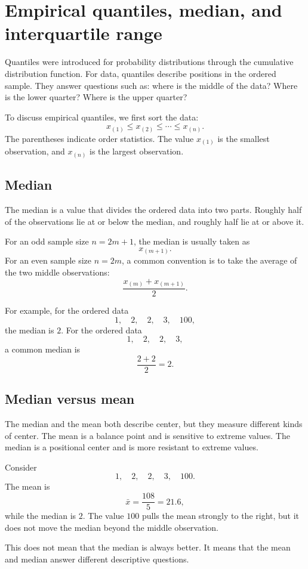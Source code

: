 \section{Empirical quantiles, median, and interquartile range}

Quantiles were introduced for probability distributions through the cumulative
distribution function. For data, quantiles describe positions in the ordered
sample. They answer questions such as: where is the middle of the data? Where is
the lower quarter? Where is the upper quarter?

To discuss empirical quantiles, we first sort the data:
\[
x_{(1)}\leq x_{(2)}\leq \cdots \leq x_{(n)}.
\]
The parentheses indicate order statistics. The value \(x_{(1)}\) is the smallest
observation, and \(x_{(n)}\) is the largest observation.

\subsection*{Median}

The median is a value that divides the ordered data into two parts. Roughly half
of the observations lie at or below the median, and roughly half lie at or above
it.

For an odd sample size \(n=2m+1\), the median is usually taken as
\[
x_{(m+1)}.
\]
For an even sample size \(n=2m\), a common convention is to take the average of
the two middle observations:
\[
\frac{x_{(m)}+x_{(m+1)}}{2}.
\]

For example, for the ordered data
\[
1,\quad 2,\quad 2,\quad 3,\quad 100,
\]
the median is \(2\). For the ordered data
\[
1,\quad 2,\quad 2,\quad 3,
\]
a common median is
\[
\frac{2+2}{2}=2.
\]

\subsection*{Median versus mean}

The median and the mean both describe center, but they measure different kinds of
center. The mean is a balance point and is sensitive to extreme values. The
median is a positional center and is more resistant to extreme values.

Consider
\[
1,\quad 2,\quad 2,\quad 3,\quad 100.
\]
The mean is
\[
\bar{x}=\frac{108}{5}=21.6,
\]
while the median is \(2\). The value \(100\) pulls the mean strongly to the right,
but it does not move the median beyond the middle observation.

This does not mean that the median is always better. It means that the mean and
median answer different descriptive questions.

